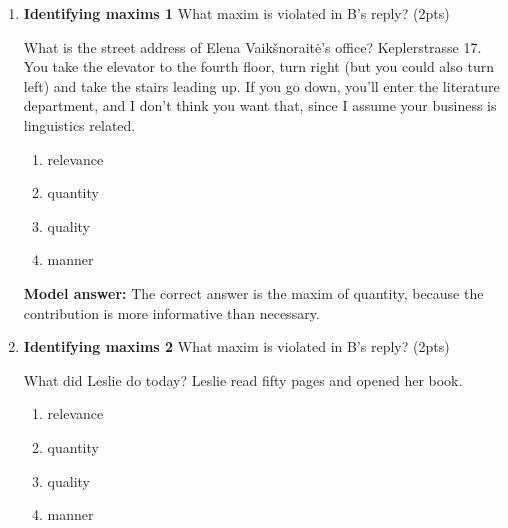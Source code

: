 \documentclass[a4,11pt]{article}
\newcommand{\6}{\mbox{$[\hspace*{-.6mm}[$}}
\newcommand{\9}{\mbox{$]\hspace*{-.6mm}]$}}
\begin{document}
\begin{enumerate}[leftmargin = 12pt]
(c) is a presupposition because it is non-defeasible and it projects.  It is non-defeasible because the example {\it  My great-grandfather was arrested this morning for drag racing. \#In fact, I don't have a great-grandfather.} is self-contradictory. It projects because the sentences  {\it My great-grandfather was not arrested this morning for drag racing. Was my great-grandfather arrested this morning for drag racing?} do not imply that the speaker has a a great-grandfather.

(b) and (d) are conversational implicatures because they are defeasible. The examples {\it That man is either Martha’s brother or her boyfriend. In fact, he is her boyfriend.} and {\it That’s a great joke – Ham, Shem and Japheth couldn’t stop laughing when they heard it from Noah. Actually, they haven't heard the joke before.} are not contradictory.


\item  { \bf Identifying maxims 1}  What maxim is violated in B's reply? (2pts)

\begin{exe}
 What is the street address of Elena Vaik\v{s}norait\.{e}'s office?
 Keplerstrasse 17. You take the elevator to the fourth floor, turn right (but you could also turn left) and take the stairs leading up. If you go down, you’ll enter the literature department, and I don’t think you want that, since I assume your business is linguistics related.
\end{exe}

\begin{enumerate}[noitemsep]
\item relevance
\item quantity
\item quality
\item manner
\end{enumerate}

{ \bf Model answer:} The  correct answer is the maxim of quantity, because the contribution is more informative than necessary. 

\item  { \bf Identifying maxims 2}  What maxim is violated in B's reply? (2pts)


\begin{exe}
 What did Leslie do today?
 Leslie read fifty pages and opened her book.
\end{exe}

\begin{enumerate}[noitemsep]
\item relevance
\item quantity
\item quality
\item manner
\end{enumerate}


\end{enumerate}
\end{document}
